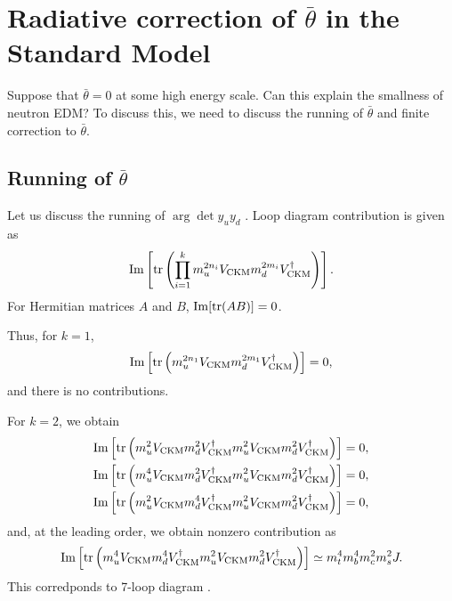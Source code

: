 \documentclass[11pt,a4paper]{article}
\begin{document}
\section{Radiative correction of $\bar\theta$ in the Standard Model}
Suppose that $\bar\theta = 0$ at some high energy scale. Can this explain the smallness of neutron EDM? To discuss this, we need to discuss the running of $\bar\theta$ and finite correction to $\bar\theta$.

\subsection{Running of $\bar\theta$}
Let us discuss the running of $\arg\det y_u y_d$ \cite{Ellis:1978hq}.
Loop diagram contribution is given as
\begin{align}
{\rm Im}\left[ {\rm tr}\left(  \prod_{i=1}^k m_u^{2n_i} V_{\rm CKM} m_d^{2m_i} V_{\rm CKM}^\dagger \right)\right].%
\end{align}
For Hermitian matrices $A$ and $B$, ${\rm Im}[{\rm tr}(AB)] = 0$. 

Thus, for $k=1$,
\begin{align}
{\rm Im}\left[ {\rm tr}\left(  m_u^{2n_1} V_{\rm CKM} m_d^{2m_1} V_{\rm CKM}^\dagger \right)\right] = 0,
\end{align}
and there is no contributions.

For $k=2$, we obtain
\begin{align}
{\rm Im}\left[ {\rm tr}\left( m_u^{2} V_{\rm CKM} m_d^{2} V_{\rm CKM}^\dagger m_u^{2} V_{\rm CKM} m_d^{2} V_{\rm CKM}^\dagger \right)\right] &= 0, \\
{\rm Im}\left[ {\rm tr}\left( m_u^{4} V_{\rm CKM} m_d^{2} V_{\rm CKM}^\dagger m_u^{2} V_{\rm CKM} m_d^{2} V_{\rm CKM}^\dagger \right)\right] &= 0, \\
{\rm Im}\left[ {\rm tr}\left( m_u^{2} V_{\rm CKM} m_d^{4} V_{\rm CKM}^\dagger m_u^{2} V_{\rm CKM} m_d^{2} V_{\rm CKM}^\dagger \right)\right] &= 0,
\end{align}
and, at the leading order, we obtain nonzero contribution as
\begin{align}
{\rm Im}\left[ {\rm tr}\left( m_u^{4} V_{\rm CKM} m_d^{4} V_{\rm CKM}^\dagger m_u^{2} V_{\rm CKM} m_d^{2} V_{\rm CKM}^\dagger \right)\right] \simeq m_t^4 m_b^4 m_c^2 m_s^2 J.%
\end{align}
This corredponds to 7-loop diagram \cite{Ellis:1978hq}.
\end{document}
